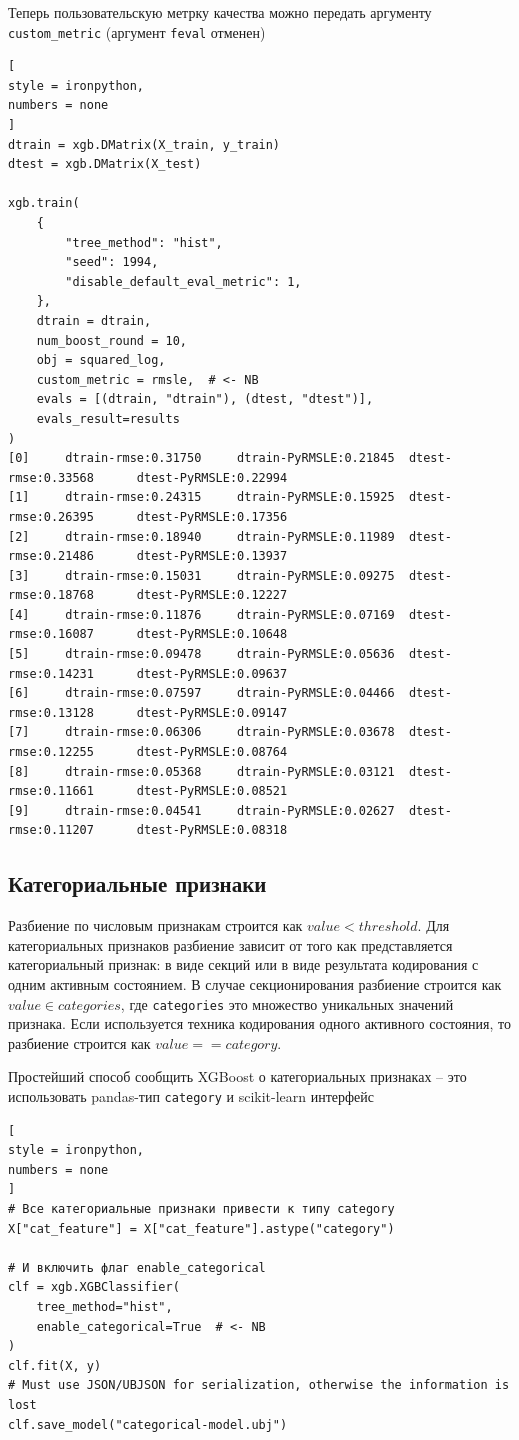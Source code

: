 \documentclass[%
	11pt,
	a4paper,
	utf8,
		]{article}
\begin{document}
Теперь пользовательскую метрку качества можно передать аргументу \verb|custom_metric| (аргумент \verb|feval| отменен)
\begin{lstlisting}[
style = ironpython,
numbers = none
]
dtrain = xgb.DMatrix(X_train, y_train)
dtest = xgb.DMatrix(X_test)

xgb.train(
    {
        "tree_method": "hist",
        "seed": 1994,
        "disable_default_eval_metric": 1,
    },
    dtrain = dtrain,
    num_boost_round = 10,
    obj = squared_log,
    custom_metric = rmsle,  # <- NB
    evals = [(dtrain, "dtrain"), (dtest, "dtest")],
    evals_result=results
)
[0]     dtrain-rmse:0.31750     dtrain-PyRMSLE:0.21845  dtest-rmse:0.33568      dtest-PyRMSLE:0.22994
[1]     dtrain-rmse:0.24315     dtrain-PyRMSLE:0.15925  dtest-rmse:0.26395      dtest-PyRMSLE:0.17356
[2]     dtrain-rmse:0.18940     dtrain-PyRMSLE:0.11989  dtest-rmse:0.21486      dtest-PyRMSLE:0.13937
[3]     dtrain-rmse:0.15031     dtrain-PyRMSLE:0.09275  dtest-rmse:0.18768      dtest-PyRMSLE:0.12227
[4]     dtrain-rmse:0.11876     dtrain-PyRMSLE:0.07169  dtest-rmse:0.16087      dtest-PyRMSLE:0.10648
[5]     dtrain-rmse:0.09478     dtrain-PyRMSLE:0.05636  dtest-rmse:0.14231      dtest-PyRMSLE:0.09637
[6]     dtrain-rmse:0.07597     dtrain-PyRMSLE:0.04466  dtest-rmse:0.13128      dtest-PyRMSLE:0.09147
[7]     dtrain-rmse:0.06306     dtrain-PyRMSLE:0.03678  dtest-rmse:0.12255      dtest-PyRMSLE:0.08764
[8]     dtrain-rmse:0.05368     dtrain-PyRMSLE:0.03121  dtest-rmse:0.11661      dtest-PyRMSLE:0.08521
[9]     dtrain-rmse:0.04541     dtrain-PyRMSLE:0.02627  dtest-rmse:0.11207      dtest-PyRMSLE:0.08318
\end{lstlisting}

\subsection{Категориальные признаки}

Разбиение по числовым признакам строится как $ value < threshold $. Для категориальных признаков разбиение зависит от того как представляется категориальный признак: в виде секций или в виде результата кодирования с одним активным состоянием. В случае секционирования разбиение строится как $ value \in categories $, где  \verb|categories| это множество уникальных значений признака. Если используется техника кодирования одного активного состояния, то разбиение строится как $ value == category $.

Простейший способ сообщить XGBoost о категориальных признаках -- это использовать pandas-тип \verb|category| и scikit-learn интерфейс
\begin{lstlisting}[
style = ironpython,
numbers = none
]
# Все категориальные признаки привести к типу category
X["cat_feature"] = X["cat_feature"].astype("category")

# И включить флаг enable_categorical
clf = xgb.XGBClassifier(
    tree_method="hist",
    enable_categorical=True  # <- NB
)
clf.fit(X, y)
# Must use JSON/UBJSON for serialization, otherwise the information is lost
clf.save_model("categorical-model.ubj")
\end{lstlisting}
\end{document}
